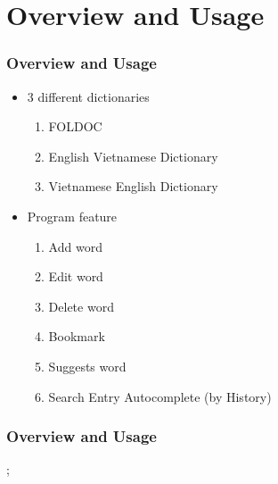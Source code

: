 \section{Overview and Usage}

\begin{frame}
\frametitle{Overview and Usage}
\begin{itemize}
  \item 3 different dictionaries
  \begin{enumerate}[1.]
    \item FOLDOC
    \item English Vietnamese Dictionary
    \item Vietnamese English Dictionary
  \end{enumerate}
  \item Program feature
  \begin{enumerate}[1.]
    \item Add word
    \item Edit word
    \item Delete word
    \item Bookmark
    \item Suggests word
    \item Search Entry Autocomplete (by History)
  \end{enumerate}
\end{itemize}
\end{frame}

\begin{frame}
  \frametitle{Overview and Usage}
  ;
\end{frame}


